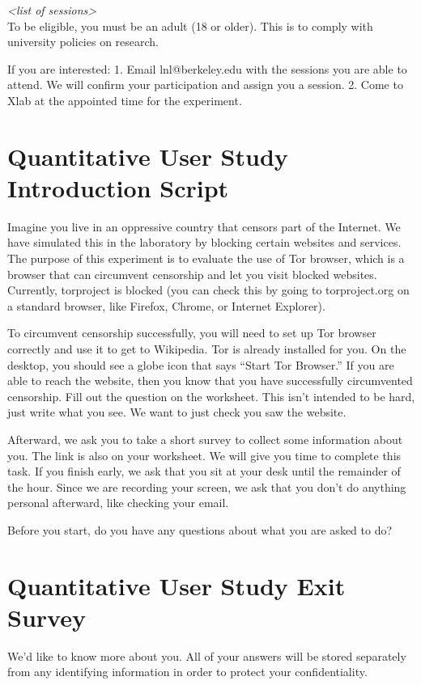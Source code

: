\documentclass[USenglish,oneside,twocolumn]{article}
\begin{document}
\textit{<list of sessions>}\\

To be eligible, you must be an adult (18 or older). This is to comply with university policies on research. 

If you are interested: 1. Email lnl@berkeley.edu with the sessions you are able to attend. We will confirm your participation and assign you a session. 2. Come to Xlab at the appointed time for the experiment.

\section{Quantitative User Study Introduction Script} 
\label{quantitative-script} 
Imagine you live in an oppressive country that censors part of the Internet. We have simulated this in the laboratory by blocking certain websites and services.  The purpose of this experiment is to evaluate the use of Tor browser, which is a browser that can circumvent censorship and let you visit blocked websites. Currently, torproject is blocked (you can check this by going to torproject.org on a standard browser, like Firefox, Chrome, or Internet Explorer). 

To circumvent censorship successfully, you will need to set up Tor browser correctly and use it to get to Wikipedia. Tor is already installed for you. On the desktop, you should see a globe icon that says ``Start Tor Browser.'' If you are able to reach the website, then you know that you have successfully circumvented censorship. Fill out the question on the worksheet. This isn't intended to be hard, just write what you see. We want to just check you saw the website. 

Afterward, we ask you to take a short survey to collect some information about you. The link is also on your worksheet.
We will give you time to complete this task. If you finish early, we ask that you sit at your desk until the remainder of the hour. Since we are recording your screen, we ask that you don't do anything personal afterward, like checking your email.

Before you start, do you have any questions about what you are asked to do? 

\section{Quantitative User Study Exit Survey} 
\label{quantitative-exit-survey}
We'd like to know more about you.  All of your answers will be stored separately from any identifying information in order to protect your confidentiality.
\end{document}
